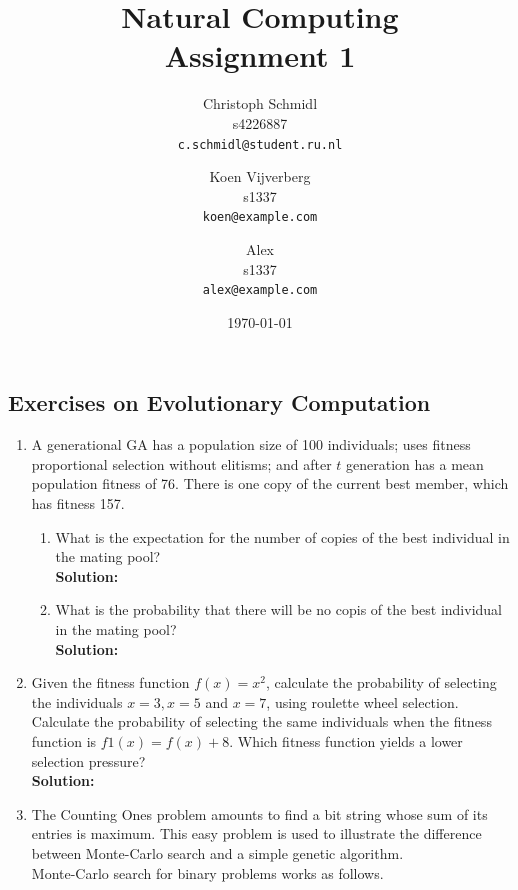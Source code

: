 \documentclass[a4paper]{article}
\title{Natural Computing\\Assignment 1}
\author{
  Christoph Schmidl\\ s4226887\\      \texttt{c.schmidl@student.ru.nl}
  \and
  Koen Vijverberg\\ s1337\\     \texttt{koen@example.com}
  \and
  Alex\\	s1337\\	\texttt{alex@example.com}
}
\date{\today}
\begin{document}
\maketitle


\subsection*{Exercises on Evolutionary Computation}

\begin{enumerate}

	\item A generational GA has a population size of 100 individuals; uses fitness proportional
selection without elitisms; and after $t$ generation has a mean population fitness of 76.
There is one copy of the current best member, which has fitness 157.

	\begin{enumerate}
		\item What is the expectation for the number of copies of the best individual in the mating pool?\\
		\textbf{Solution:}\\
		
		\item What is the probability that there will be no copis of the best individual in the mating pool?\\
		\textbf{Solution:}\\
		
	
	\end{enumerate}

	\item Given the fitness function $f(x) = x^2$, calculate the probability of selecting the individuals $x = 3, x = 5$ and $x = 7$, using roulette wheel selection. Calculate the probability of selecting the same individuals when the fitness function is $f1(x) = f(x) + 8$. Which fitness function yields a lower selection pressure?\\
	\textbf{Solution:}\\	



	\item The Counting Ones problem amounts to find a bit string whose sum of its entries is maximum. This easy problem is used to illustrate the difference between Monte-Carlo search and a simple genetic algorithm.\\
	Monte-Carlo search for binary problems works as follows.
	

\end{enumerate}
\end{document}
